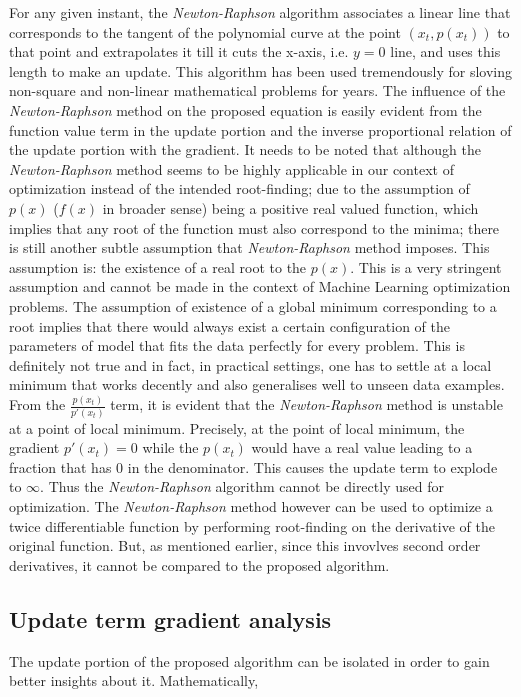 \documentclass{article}
\begin{document}
For any given instant, the \textit{Newton-Raphson} algorithm associates a linear line that corresponds to the tangent of the polynomial curve at the point $(x_t, p(x_t))$ to that point and extrapolates it till it cuts the x-axis, i.e. $y = 0$ line, and uses this length to make an update. This algorithm has been used tremendously for sloving non-square and non-linear mathematical problems for years. The influence of the \textit{Newton-Raphson} method on the proposed equation is easily evident from the function value term in the update portion and the inverse proportional relation of the update portion with the gradient. It needs to be noted that although the \textit{Newton-Raphson} method seems to be highly applicable in our context of optimization instead of the intended root-finding; due to the assumption of $p(x)$ ($f(x)$ in broader sense) being a positive real valued function, which implies that any root of the function must also correspond to the minima; there is still another subtle assumption that \textit{Newton-Raphson} method imposes. This assumption is: the existence of a real root to the $p(x)$. This is a very stringent assumption and cannot be made in the context of Machine Learning optimization problems. The assumption of existence of a global minimum corresponding to a root implies that there would always exist a certain configuration of the parameters of model that fits the data perfectly for every problem. This is definitely not true and in fact, in practical settings, one has to settle at a local minimum that works decently and also generalises well to unseen data examples. From the $\frac{p(x_t)}{p'(x_t)}$ term, it is evident that the \textit{Newton-Raphson} method is unstable at a point of local minimum. Precisely, at the point of local minimum, the gradient $p'(x_t) = 0$ while the $p(x_t)$ would have a real value leading to a fraction that has $0$ in the denominator. This causes the update term to explode to $\infty$. Thus the \textit{Newton-Raphson} algorithm cannot be directly used for optimization. The \textit{Newton-Raphson} method however can be used to optimize a twice differentiable function by performing root-finding on the derivative of the original function. But, as mentioned earlier, since this invovlves second order derivatives, it cannot be compared to the proposed algorithm.

\subsection{Update term gradient analysis}
The update portion of the proposed algorithm can be isolated in order to gain better insights about it. Mathematically,
\end{document}

